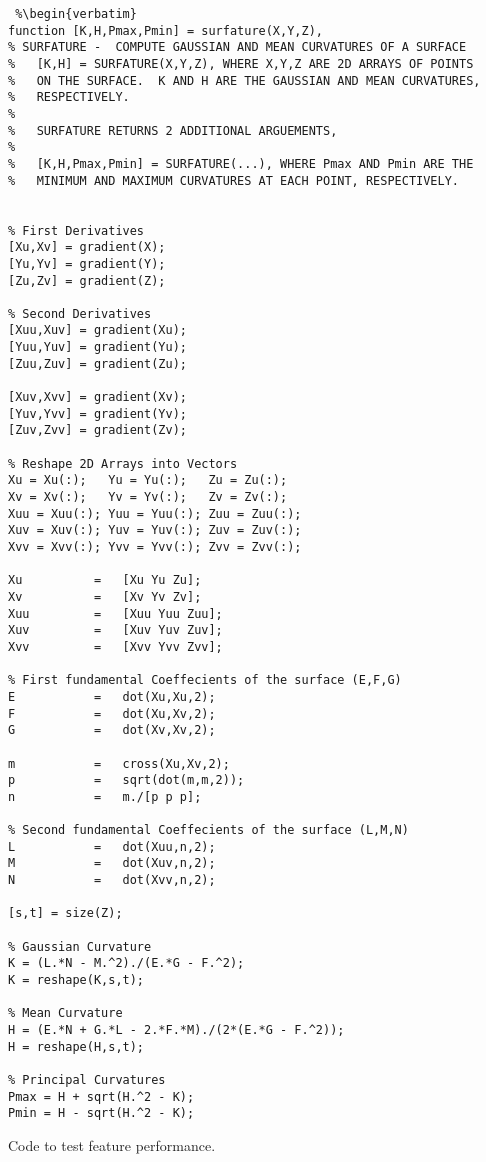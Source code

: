 \begin{lstlisting} %\begin{verbatim}
function [K,H,Pmax,Pmin] = surfature(X,Y,Z),
% SURFATURE -  COMPUTE GAUSSIAN AND MEAN CURVATURES OF A SURFACE
%   [K,H] = SURFATURE(X,Y,Z), WHERE X,Y,Z ARE 2D ARRAYS OF POINTS
%   ON THE SURFACE.  K AND H ARE THE GAUSSIAN AND MEAN CURVATURES,
%   RESPECTIVELY.
%
%   SURFATURE RETURNS 2 ADDITIONAL ARGUEMENTS,
%
%   [K,H,Pmax,Pmin] = SURFATURE(...), WHERE Pmax AND Pmin ARE THE
%   MINIMUM AND MAXIMUM CURVATURES AT EACH POINT, RESPECTIVELY.


% First Derivatives
[Xu,Xv] = gradient(X);
[Yu,Yv] = gradient(Y);
[Zu,Zv] = gradient(Z);

% Second Derivatives
[Xuu,Xuv] = gradient(Xu);
[Yuu,Yuv] = gradient(Yu);
[Zuu,Zuv] = gradient(Zu);

[Xuv,Xvv] = gradient(Xv);
[Yuv,Yvv] = gradient(Yv);
[Zuv,Zvv] = gradient(Zv);

% Reshape 2D Arrays into Vectors
Xu = Xu(:);   Yu = Yu(:);   Zu = Zu(:);
Xv = Xv(:);   Yv = Yv(:);   Zv = Zv(:);
Xuu = Xuu(:); Yuu = Yuu(:); Zuu = Zuu(:);
Xuv = Xuv(:); Yuv = Yuv(:); Zuv = Zuv(:);
Xvv = Xvv(:); Yvv = Yvv(:); Zvv = Zvv(:);

Xu          =   [Xu Yu Zu];
Xv          =   [Xv Yv Zv];
Xuu         =   [Xuu Yuu Zuu];
Xuv         =   [Xuv Yuv Zuv];
Xvv         =   [Xvv Yvv Zvv];

% First fundamental Coeffecients of the surface (E,F,G)
E           =   dot(Xu,Xu,2);
F           =   dot(Xu,Xv,2);
G           =   dot(Xv,Xv,2);

m           =   cross(Xu,Xv,2);
p           =   sqrt(dot(m,m,2));
n           =   m./[p p p];

% Second fundamental Coeffecients of the surface (L,M,N)
L           =   dot(Xuu,n,2);
M           =   dot(Xuv,n,2);
N           =   dot(Xvv,n,2);

[s,t] = size(Z);

% Gaussian Curvature
K = (L.*N - M.^2)./(E.*G - F.^2);
K = reshape(K,s,t);

% Mean Curvature
H = (E.*N + G.*L - 2.*F.*M)./(2*(E.*G - F.^2));
H = reshape(H,s,t);

% Principal Curvatures
Pmax = H + sqrt(H.^2 - K);
Pmin = H - sqrt(H.^2 - K);
\end{lstlisting} %
\clearpage

Code to test feature performance.

